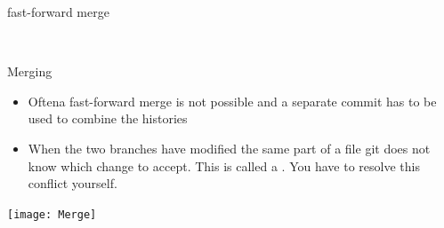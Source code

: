 \documentclass[12pt]{beamer}
\begin{document}
\begin{frame}{fast-forward merge}
	 \begin{figure}
 \begin{subfigure}[b]{\textwidth}
	\centering
\end{subfigure}
\\[3pt]
\begin{subfigure}[b]{\textwidth}
	\centering
\end{subfigure}
\end{figure}
\end{frame}

\begin{frame}[fragile]{Merging}
	\begin{itemize}
		\item Oftena fast-forward merge is not possible and a separate commit has to be used to combine the histories
		\item When the two branches have modified the same part of a file git does not know which change to accept. This is called a \textbf{}. You have to resolve this conflict yourself. 
	\end{itemize}
\end{frame}

\begin{frame}
	\begin{center}
		\texttt{[image: Merge]}
	\end{center}
\end{frame}
\end{document}
